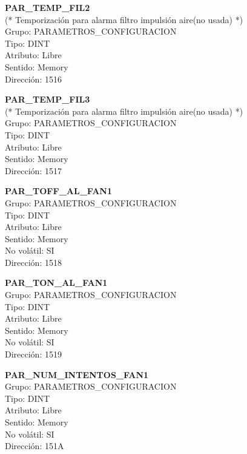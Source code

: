 \vspace{10mm}

\textbf{PAR\_TEMP\_FIL2}\\(* Temporización para alarma filtro impulsión aire(no usada) *)\\Grupo: PARAMETROS\_CONFIGURACION\\Tipo: DINT\\Atributo: Libre\\Sentido: Memory\\Dirección: 1516

\vspace{10mm}

\textbf{PAR\_TEMP\_FIL3}\\(* Temporización para alarma filtro impulsión aire(no usada) *)\\Grupo: PARAMETROS\_CONFIGURACION\\Tipo: DINT\\Atributo: Libre\\Sentido: Memory\\Dirección: 1517

\vspace{10mm}

\textbf{PAR\_TOFF\_AL\_FAN1}\\Grupo: PARAMETROS\_CONFIGURACION\\Tipo: DINT\\Atributo: Libre\\Sentido: Memory\\No volátil: SI\\Dirección: 1518

\vspace{10mm}

\textbf{PAR\_TON\_AL\_FAN1}\\Grupo: PARAMETROS\_CONFIGURACION\\Tipo: DINT\\Atributo: Libre\\Sentido: Memory\\No volátil: SI\\Dirección: 1519

\vspace{10mm}

\textbf{PAR\_NUM\_INTENTOS\_FAN1}\\Grupo: PARAMETROS\_CONFIGURACION\\Tipo: DINT\\Atributo: Libre\\Sentido: Memory\\No volátil: SI\\Dirección: 151A

